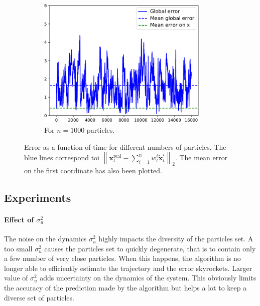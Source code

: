 \documentclass[english, DIV=13]{scrartcl}
\newcommand\norm[1]{\left\lVert#1\right\rVert}
\begin{document}
\begin{figure}
\begin{subfigure}{0.49\textwidth}
        \includegraphics[width=0.9\textwidth]{figures/error-1000}
        \caption{For $n=1000$ particles.} 
        \label{fig:q3-error-1000}
    \end{subfigure}
    \caption{Error as a function of time for different numbers of particles. The blue
    lines correspond toi
    $\norm{\mathbf{x}_t^{\text{real}} - \sum_{i=1}^n w_t^i\tilde{\mathbf{x}}_t^i}_2$.
    The mean error on the first coordinate has also been plotted.}
\end{figure}

\subsection{Experiments}
\paragraph{Effect of $\sigma^2_u$}
The noise on the dynamics $\sigma^2_u$ highly impacts the diversity of the particles set.
A too small $\sigma^2_u$ causes the particles set to quickly degenerate, that is to
contain only a few number of very close particles. When this happens, the algorithm is
no longer able to efficiently estimate the trajectory and the error skyrockets. Larger
value of $\sigma^2_u$ adds uncertainty on the dynamics of the system. This obviously
limits the accuracy of the prediction made by the algorithm but helps a lot to keep
a diverse set of particles.
\end{document}
